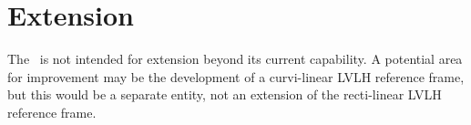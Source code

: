 %
%
% 
%

 \section{Extension}

The \LVLHDesc\ is not intended for extension beyond its current capability.  A potential area for improvement may be the development of a curvi-linear LVLH reference frame, but this would be a separate entity, not an extension of the recti-linear LVLH reference frame.
